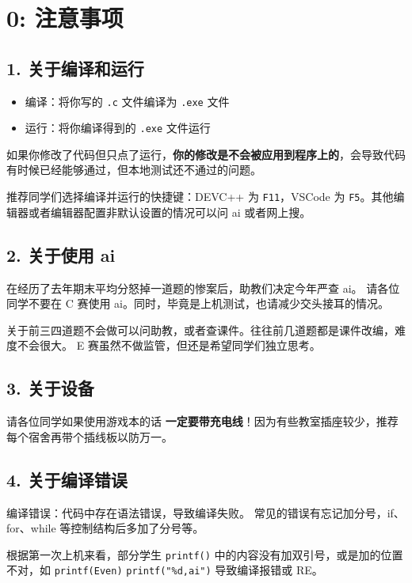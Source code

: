 \documentclass[UTF8]{ctexart}
\newcommand{\code}[1]{\colorbox{gray!10}{\texttt{#1}}}
\begin{document}
\section*{0: 注意事项}

\subsection*{1. 关于编译和运行}

\begin{itemize}
  \item 编译：将你写的 \code{.c} 文件编译为 \code{.exe} 文件
  \item 运行：将你编译得到的 \code{.exe} 文件运行
\end{itemize}

如果你修改了代码但只点了运行，\textbf{你的修改是不会被应用到程序上的}，会导致代码有时候已经能够通过，但本地测试还不通过的问题。

推荐同学们选择编译并运行的快捷键：DEVC++ 为 \code{F11}，VSCode 为 \code{F5}。其他编辑器或者编辑器配置非默认设置的情况可以问 ai 或者网上搜。

\subsection*{2. 关于使用 ai}

在经历了去年期末平均分怒掉一道题的惨案后，助教们决定今年严查 ai。
请各位同学不要在 C 赛使用 ai。同时，毕竟是上机测试，也请减少交头接耳的情况。

关于前三四道题不会做可以问助教，或者查课件。往往前几道题都是课件改编，难度不会很大。
E 赛虽然不做监管，但还是希望同学们独立思考。

\subsection*{3. 关于设备}

请各位同学如果使用游戏本的话 \textbf{一定要带充电线}！因为有些教室插座较少，推荐每个宿舍再带个插线板以防万一。

\subsection*{4. 关于编译错误}

编译错误：代码中存在语法错误，导致编译失败。
常见的错误有忘记加分号，if、for、while 等控制结构后多加了分号等。

根据第一次上机来看，部分学生 \code{printf()} 中的内容没有加双引号，或是加的位置不对，如 \code{printf(Even)} \code{printf("\%d,ai")} 导致编译报错或 RE。
\end{document}
